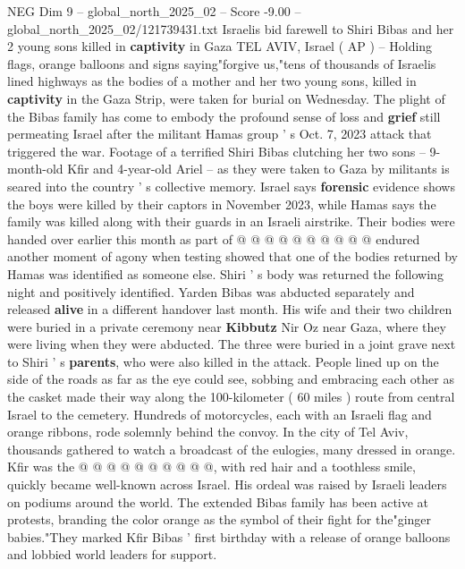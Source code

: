 \begin{textsample}{NEG Dim 9 – global\_north\_2025\_02 – Score -9.00 – global\_north\_2025\_02/121739431.txt}  \label{ex:f9_neg_059}
Israelis bid farewell to Shiri Bibas and her 2 young sons killed in \textbf{captivity} in Gaza TEL AVIV, Israel ( AP ) -- Holding flags, orange balloons and signs saying"forgive us,"tens of thousands of Israelis lined highways as the bodies of a mother and her two young sons, killed in \textbf{captivity} in the Gaza Strip, were taken for burial on Wednesday.
The plight of the Bibas family has come to embody the profound sense of loss and \textbf{grief} still permeating Israel after the militant Hamas group ' s Oct. 7, 2023 attack that triggered the war.
Footage of a terrified Shiri Bibas clutching her two sons -- 9-month-old Kfir and 4-year-old Ariel -- as they were taken to Gaza by militants is seared into the country ' s collective memory.
Israel says \textbf{forensic} evidence shows the boys were killed by their captors in November 2023, while Hamas says the family was killed along with their guards in an Israeli airstrike.
Their bodies were handed over earlier this month as part of @ @ @ @ @ @ @ @ @ @ endured another moment of agony when testing showed that one of the bodies returned by Hamas was identified as someone else.
Shiri ' s body was returned the following night and positively identified.
Yarden Bibas was abducted separately and released \textbf{alive} in a different handover last month.
His wife and their two children were buried in a private ceremony near \textbf{Kibbutz} Nir Oz near Gaza, where they were living when they were abducted.
The three were buried in a joint grave next to Shiri ' s \textbf{parents}, who were also killed in the attack.
People lined up on the side of the roads as far as the eye could see, sobbing and embracing each other as the casket made their way along the 100-kilometer ( 60 miles ) route from central Israel to the cemetery.
Hundreds of motorcycles, each with an Israeli flag and orange ribbons, rode solemnly behind the convoy.
In the city of Tel Aviv, thousands gathered to watch a broadcast of the eulogies, many dressed in orange.
Kfir was the @ @ @ @ @ @ @ @ @ @, with red hair and a toothless smile, quickly became well-known across Israel.
His ordeal was raised by Israeli leaders on podiums around the world.
The extended Bibas family has been active at protests, branding the color orange as the symbol of their fight for the"ginger babies."They marked Kfir Bibas ' first birthday with a release of orange balloons and lobbied world leaders for support.

\end{textsample}
